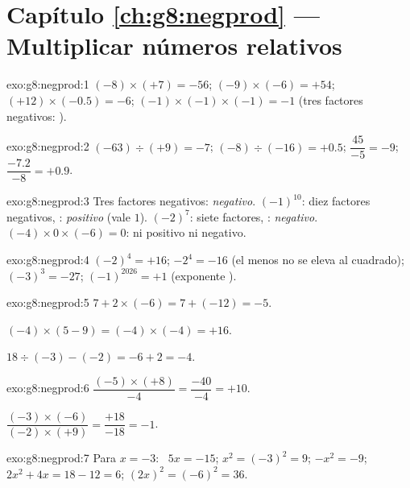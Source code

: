 \section*{Capítulo \ref{ch:g8:negprod} --- Multiplicar números relativos}

\begin{solution}{exo:g8:negprod:1}
$(-8) \times (+7) = -56$; \quad
$(-9) \times (-6) = +54$; \quad
$(+12) \times (-0.5) = -6$; \quad
$(-1) \times (-1) \times (-1) = -1$ (tres factores negativos: ).
\end{solution}

\begin{solution}{exo:g8:negprod:2}
$(-63) \div (+9) = -7$; \quad
$(-8) \div (-16) = +0.5$; \quad
$\dfrac{45}{-5} = -9$; \quad
$\dfrac{-7.2}{-8} = +0.9$.
\end{solution}

\begin{solution}{exo:g8:negprod:3}
Tres factores negativos: \emph{negativo}. \quad
$(-1)^{10}$: diez factores negativos, : \emph{positivo} (vale
$1$). \quad
$(-2)^7$: siete factores, : \emph{negativo}. \quad
$(-4) \times 0 \times (-6) = 0$: ni positivo ni negativo.
\end{solution}

\begin{solution}{exo:g8:negprod:4}
$(-2)^4 = +16$; \quad $-2^4 = -16$ (el menos no se eleva al cuadrado); \quad
$(-3)^3 = -27$; \quad $(-1)^{2026} = +1$ (exponente ).
\end{solution}

\begin{solution}{exo:g8:negprod:5}
$7 + 2 \times (-6) = 7 + (-12) = -5$.

$(-4) \times (5 - 9) = (-4) \times (-4) = +16$.

$18 \div (-3) - (-2) = -6 + 2 = -4$.
\end{solution}

\begin{solution}{exo:g8:negprod:6}
$\dfrac{(-5) \times (+8)}{-4} = \dfrac{-40}{-4} = +10$.

$\dfrac{(-3) \times (-6)}{(-2) \times (+9)} = \dfrac{+18}{-18} = -1$.
\end{solution}

\begin{solution}{exo:g8:negprod:7}
Para $x = -3$: \ $5x = -15$; \quad $x^2 = (-3)^2 = 9$; \quad
$-x^2 = -9$; \quad $2x^2 + 4x = 18 - 12 = 6$; \quad
$(2x)^2 = (-6)^2 = 36$.
\end{solution}

